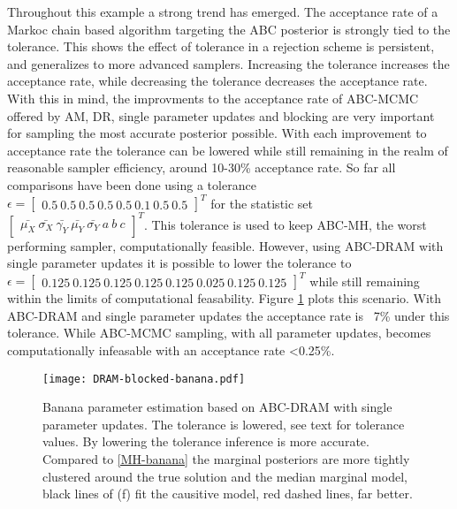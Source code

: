 Throughout this example a strong trend has emerged. The acceptance rate of a Markoc chain based algorithm targeting the ABC posterior is strongly tied to the tolerance. This shows the effect of tolerance in a rejection scheme is persistent, and generalizes to more advanced samplers. Increasing the tolerance increases the acceptance rate, while decreasing the tolerance decreases the acceptance rate. With this in mind, the improvments to the acceptance rate of ABC-MCMC offered by AM, DR, single parameter updates and blocking are very important for sampling the most accurate posterior possible. With each improvement to acceptance rate the tolerance can be lowered while still remaining in the realm of reasonable sampler efficiency, around 10-30\% acceptance rate. So far all comparisons have been done using a tolerance $\epsilon =\begin{bmatrix}
0.5\ 0.5\ 0.5\ 0.5\ 0.5\ 0.1\ 0.5\ 0.5
\end{bmatrix}^T$ 
for the statistic set $\begin{bmatrix}
\bar{\mu_X}\ \bar{\sigma_X}\ \bar{\gamma_Y}\ \bar{\mu_Y}\ \bar{\sigma_Y}\ a\ b\ c
\end{bmatrix}^T$. This tolerance is used to keep ABC-MH, the worst performing sampler, computationally feasible. However, using ABC-DRAM with single parameter updates it is possible to lower the tolerance to 
$\epsilon = \begin{bmatrix}
0.125\ 0.125\ 0.125\ 0.125\ 0.125\ 0.025\ 0.125\ 0.125
\end{bmatrix}^T$
while still remaining within the limits of computational feasability. Figure \ref{best-banana} plots this scenario. With ABC-DRAM and single parameter updates the acceptance rate is ~7\% under this tolerance. While ABC-MCMC sampling, with all parameter updates, becomes computationally infeasable with an acceptance rate <0.25\%.

\begin{figure}[H]
\centering
\texttt{[image: DRAM-blocked-banana.pdf]}
\caption{Banana parameter estimation based on ABC-DRAM with single parameter updates. The tolerance is lowered, see text for tolerance values. By lowering the tolerance inference is more accurate. Compared to \ref{MH-banana} the marginal posteriors are more tightly clustered around the true solution and the median marginal model, black lines of (f) fit the causitive model, red dashed lines, far better.}
\label{best-banana}
\end{figure}